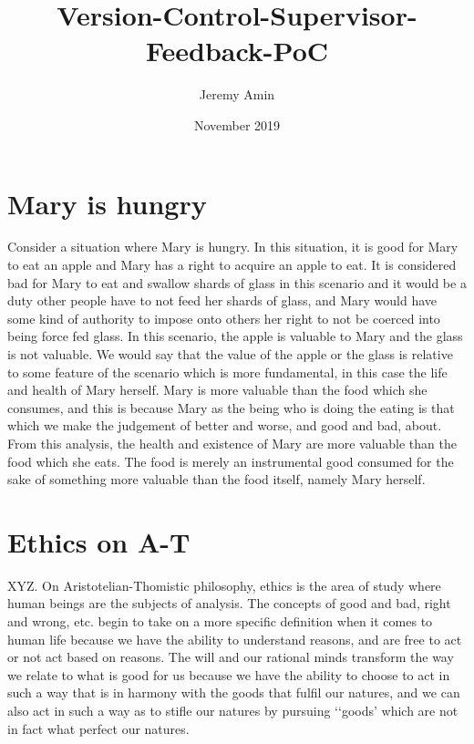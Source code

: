 \documentclass{article}
\title{Version-Control-Supervisor-Feedback-PoC}
\author{Jeremy Amin}
\date{November 2019}
\begin{document}
\maketitle
\tableofcontents

\pagebreak

\section{Mary is hungry}

Consider a situation where Mary is hungry. In this situation, it is good for Mary to eat an apple and Mary has a right to acquire an apple to eat. It is considered bad for Mary to eat and swallow shards of glass in this scenario and it would be a duty other people have to not feed her shards of glass, and Mary would have some kind of authority to impose onto others her right to not be coerced into being force fed glass. In this scenario, the apple is valuable to Mary and the glass is not valuable. We would say that the value of the apple or the glass is relative to some feature of the scenario which is more fundamental, in this case the life and health of Mary herself. Mary is more valuable than the food which she consumes, and this is because Mary as the being who is doing the eating is that which we make the judgement of better and worse, and good and bad, about. From this analysis, the health and existence of Mary are more valuable than the food which she eats. The food is merely an instrumental good consumed for the sake of something more valuable than the food itself, namely Mary herself.

\section{Ethics on A-T}

XYZ. On Aristotelian-Thomistic philosophy, ethics is the area of study where human beings are the subjects of analysis. The concepts of good and bad, right and wrong, etc. begin to take on a more specific definition when it comes to human life because we have the ability to understand reasons, and are free to act or not act based on reasons. The will and our rational minds transform the way we relate to what is good for us because we have the ability to choose to act in such a way that is in harmony with the goods that fulfil our natures, and we can also act in such a way as to stifle our natures by pursuing ‘‘goods’ which are not in fact what perfect our natures.
\end{document}
